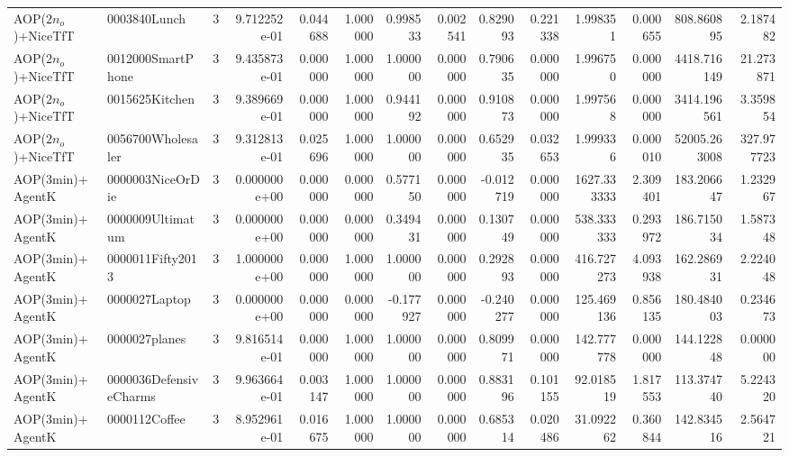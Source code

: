 \begin{tabular}{llrr|r|rr|rr|rr|rrr}
     AOP($2 n_o$)+NiceTfT &           0003840Lunch &       3 & 9.712252e-01 & 0.044688 & 1.000000 &      0.998533 & 0.002541 &      0.829093 & 0.221338 &      1.998351 &    0.000655 &   808.860895 &    2.187482 \\
     AOP($2 n_o$)+NiceTfT &      0012000SmartPhone &       3 & 9.435873e-01 & 0.000000 & 1.000000 &      1.000000 & 0.000000 &      0.790635 & 0.000000 &      1.996750 &    0.000000 &  4418.716149 &   21.273871 \\
     AOP($2 n_o$)+NiceTfT &         0015625Kitchen &       3 & 9.389669e-01 & 0.000000 & 1.000000 &      0.944192 & 0.000000 &      0.910873 & 0.000000 &      1.997568 &    0.000000 &  3414.196561 &    3.359854 \\
     AOP($2 n_o$)+NiceTfT &      0056700Wholesaler &       3 & 9.312813e-01 & 0.025696 & 1.000000 &      1.000000 & 0.000000 &      0.652935 & 0.032653 &      1.999336 &    0.000010 & 52005.263008 &  327.977723 \\
         AOP(3min)+AgentK &       0000003NiceOrDie &       3 & 0.000000e+00 & 0.000000 & 0.000000 &      0.577150 & 0.000000 &     -0.012719 & 0.000000 &   1627.333333 &    2.309401 &   183.206647 &    1.232967 \\
         AOP(3min)+AgentK &       0000009Ultimatum &       3 & 0.000000e+00 & 0.000000 & 0.000000 &      0.349431 & 0.000000 &      0.130749 & 0.000000 &    538.333333 &    0.293972 &   186.715034 &    1.587348 \\
         AOP(3min)+AgentK &       0000011Fifty2013 &       3 & 1.000000e+00 & 0.000000 & 1.000000 &      1.000000 & 0.000000 &      0.292893 & 0.000000 &    416.727273 &    4.093938 &   162.286931 &    2.224048 \\
         AOP(3min)+AgentK &          0000027Laptop &       3 & 0.000000e+00 & 0.000000 & 0.000000 &     -0.177927 & 0.000000 &     -0.240277 & 0.000000 &    125.469136 &    0.856135 &   180.484003 &    0.234673 \\
         AOP(3min)+AgentK &          0000027planes &       3 & 9.816514e-01 & 0.000000 & 1.000000 &      1.000000 & 0.000000 &      0.809971 & 0.000000 &    142.777778 &    0.000000 &   144.122848 &    0.000000 \\
         AOP(3min)+AgentK & 0000036DefensiveCharms &       3 & 9.963664e-01 & 0.003147 & 1.000000 &      1.000000 & 0.000000 &      0.883196 & 0.101155 &     92.018519 &    1.817553 &   113.374740 &    5.224320 \\
         AOP(3min)+AgentK &          0000112Coffee &       3 & 8.952961e-01 & 0.016675 & 1.000000 &      1.000000 & 0.000000 &      0.685314 & 0.020486 &     31.092262 &    0.360844 &   142.834516 &    2.564721 \\

\end{tabular}
